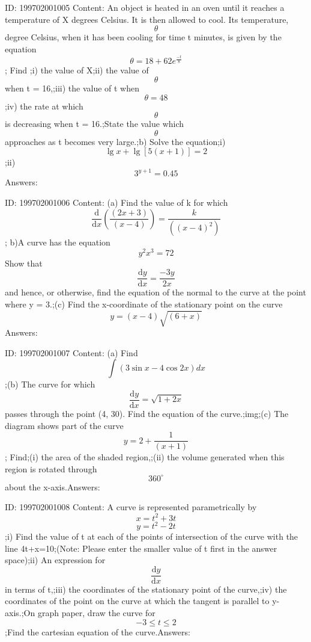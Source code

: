 \documentclass{article}
\begin{document}
ID: 199702001005
Content:
An object is heated in an oven until it reaches a temperature of X degrees Celsius. It is then allowed to cool. Its temperature, \[\theta\] degree Celsius, when it has been cooling for time t minutes, is given by the equation \[\theta = 18+62e^\frac{-t}{8}\]; Find ;i) the value of X;ii) the value of \[\theta\] when t = 16,;iii) the value of t when \[\theta=48\];iv) the rate at which \[\theta\]  is decreasing when t = 16.;State the value which \[\theta\] approaches as t becomes very large.;b) Solve the equation;i) \[\lg x+\lg[5(x+1)]=2\];ii) \[3^{y+1}=0.45\]Answers:

ID: 199702001006
Content:
(a)	Find the value of k for which \[\frac{\mathrm{d} }{\mathrm{d} x}(\frac{(2x+3)}{(x-4)})=\frac{k}{((x-4)^2)}\]; b)A curve has the equation \[y^2x^3=72\] Show that \[\frac{\mathrm{d} y}{\mathrm{d} x}=\frac{-3y}{2x}\]and hence, or otherwise, find the equation of the normal to the curve at the point where y = 3.;(c) Find the x-coordinate of the stationary point on the curve \[y=(x-4)\sqrt{(6+x)}\]Answers:

ID: 199702001007
Content:
(a)	Find \[\int(3\sin x-4\cos 2x)dx\];(b)	The curve for which \[\frac{\mathrm{d} y}{\mathrm{d} x}=\sqrt{1+2x}\]  passes through the point (4, 30). Find the equation of the curve.;img;(c)	The diagram shows part of the curve \[y=2+\frac{1}{(x+1)}\];  Find;(i)	the area of the shaded region,;(ii)	the volume generated when this region is rotated through \[360^{\circ}\] about the x-axis.Answers:

ID: 199702001008
Content:
A curve is represented parametrically by \[x=t^2+3t\] \[y=t^2-2t\] ;i) Find the value of t at each of the points of intersection of the curve with the line 4t+x=10;(Note: Please enter the smaller value of t first in the answer space);ii) An expression for \[\frac{\mathrm{d} y}{\mathrm{d} x}\] in terms of t,;iii) the coordinates of the stationary point of the curve,;iv) the coordinates of the point on the curve at which the tangent is parallel to y-axis.;On graph paper, draw the curve for \[-3\leq t\leq 2\];Find the cartesian equation of the curve.Answers:
\end{document}
